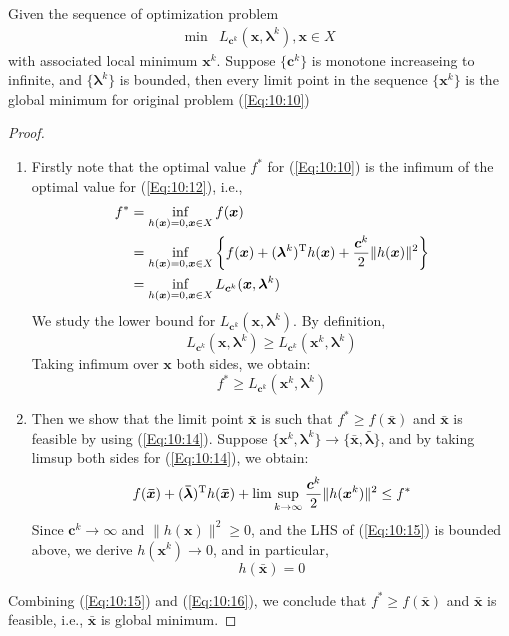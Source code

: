 \begin{theorem}
Given the sequence of optimization problem
\begin{equation}\label{Eq:10:12}
\begin{array}{ll}
\min&L_{\bm c^k}(\bm x,\bm\lambda^k),\bm x\in X
\end{array}
\end{equation}
with associated local minimum $\bm x^k$. Suppose $\{\bm c^k\}$ is monotone increaseing to infinite, and $\{\bm\lambda^k\}$ is bounded, then every limit point in the sequence $\{\bm x^k\}$ is the global minimum for original problem (\ref{Eq:10:10})
\end{theorem}
\begin{proof}
\begin{enumerate}
\item
Firstly note that the optimal value $f^*$ for (\ref{Eq:10:10}) is the infimum of the optimal value for (\ref{Eq:10:12}), i.e., 
\begin{align*}
f^*&=\inf_{h(\bm x)=0,\bm x\in X}f(\bm x)\\
&=\inf_{h(\bm x)=0,\bm x\in X}\left\{
f(\bm x)+(\bm\lambda^k)^{\mathrm T} h(\bm x)+\frac{\bm c^k}{2}\|h(\bm x)\|^2
\right\}\\
&=\inf_{h(\bm x)=0,\bm x\in X}L_{\bm c^k}(\bm x,\bm\lambda^k)
\end{align*}
We study the lower bound for $L_{\bm c^k}(\bm x,\bm\lambda^k)$. By definition,
\begin{equation}
L_{\bm c^k}(\bm x,\bm\lambda^k)\ge L_{\bm c^k}(\bm x^k,\bm\lambda^k) 
\end{equation}
Taking infimum over $\bm x$ both sides, we obtain:
\begin{equation}\label{Eq:10:14}
f^*\ge L_{\bm c^k}(\bm x^k,\bm\lambda^k) 
\end{equation}
\item
Then we show that the limit point $\bm{\bar x}$ is such that $f^*\ge f(\bm{\bar x})$ and $\bm{\bar x}$ is feasible by using (\ref{Eq:10:14}). Suppose $\{\bm x^k,\bm\lambda^k\}\to\{\bm{\bar x},\bm{\bar\lambda}\}$, and by taking limsup both sides for (\ref{Eq:10:14}), we obtain:
\begin{equation}\label{Eq:10:15}
f(\bm{\bar x})+(\bm{\bar\lambda})\trans h(\bm{\bar x})+\lim\sup_{k\to\infty}\frac{\bm c^k}{2}\|h(\bm x^k)\|^2\le f^*
\end{equation}
Since $\bm c^k\to\infty$ and $\|h(\bm x)\|^2\ge0$, and the LHS of (\ref{Eq:10:15}) is bounded above, we derive $h(\bm x^k)\to0$, and in particular, 
\begin{equation}\label{Eq:10:16}
h(\bm{\bar x})=0
\end{equation}
\end{enumerate}
Combining (\ref{Eq:10:15}) and (\ref{Eq:10:16}), we conclude that $f^*\ge f(\bm{\bar x})$ and $\bm{\bar x}$ is feasible, i.e., $\bm{\bar x}$ is global minimum.
\end{proof}



















